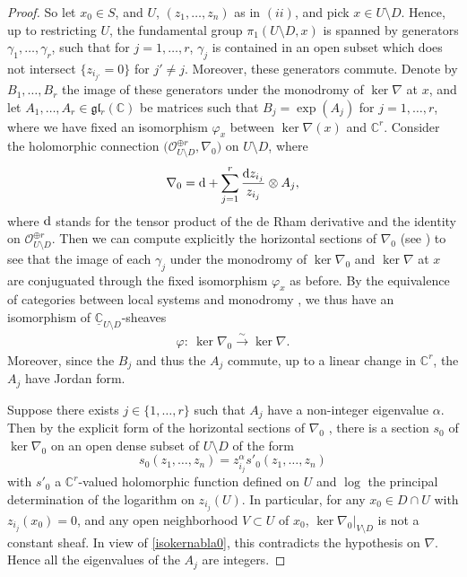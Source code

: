 \documentclass[pdftex]{sigma}
\numberwithin{equation}{section}
\begin{document}
\begin{proof}
So let $x_0\in S$, and $U$, $(z_1,\dots,z_n)$ as in $(ii)$, and pick $x\in U\setminus D$. Hence, up to restricting $U$, the fundamental group $\pi_1(U\setminus D,x)$ is spanned by generators $\gamma_1,\dots,\gamma_r$, such that for $j=1,\dots,r$, $\gamma_j$ is contained in an open subset which does not intersect $\{z_{i_{j'}}=0\}$ for $j'\neq j$. Moreover, these generators commute. Denote by $B_1,\dots,B_r$ the image of these generators under the monodromy of $\ker \nabla$ at $x$, and let $A_1,\dots,A_r\in \mathfrak{g}\mathfrak{l}_r(\mathbb{C})$ be matrices such that $B_j=\exp(A_j)$ for $j=1,\dots,r$, where we have fixed an isomorphism $\varphi_x$ between $\ker \nabla(x)$ and $\mathbb{C}^r$. Consider the holomorphic connection $\big(\mathcal{O}_{U\setminus D}^{\oplus r},\nabla_0\big)$ on $U\setminus D$, where
 \begin{gather*} \nabla_0 = {\rm d}+ \sum_{j=1}^{r} \frac{{\rm d}z_{i_j}}{z_{i_j}} \otimes A_j,
 \end{gather*}
 where ${\rm d}$ stands for the tensor product of the de Rham derivative and the identity on $\mathcal{O}_{U\setminus D}^{\oplus r}$. Then we can compute explicitly the horizontal sections of $\nabla_0$ (see \cite[p.~93]{Deligne}) to see that the image of each $\gamma_j$ under the monodromy of $\ker  \nabla_0$ and $\ker  \nabla$ at $x$ are conjuguated through the fixed isomorphism $\varphi_x$ as before. By the equivalence of categories between local systems and monodromy \cite[Chapter~I, Theorem~2.17]{Deligne}, we thus have an isomorphism of $\underline{\mathbb{C}}_{U\setminus D}$-sheaves
 \begin{gather}\label{isokernabla0} \varphi\colon\ \ker  \nabla_0 \overset{\sim}{\longrightarrow} \ker  \nabla. \end{gather}
 Moreover, since the $B_j$ and thus the $A_j$ commute, up to a linear change in $\mathbb{C}^r$, the $A_j$ have Jordan form.

Suppose there exists $j\in \{1,\dots,r\}$ such that $A_j$ have a non-integer eigenvalue $\alpha$. Then by the explicit form of the horizontal sections of $\nabla_0$ \cite[p.~93]{Deligne}, there is a section $s_0$ of $\ker  \nabla_0$ on an open dense subset of $U\setminus D$ of the form
\[s_0(z_1,\dots,z_n)=z_{i_j}^\alpha s'_0(z_1,\dots,z_n)\]
with $s'_0$ a $\mathbb{C}^r$-valued holomorphic function defined on $U$ and $\log$ the principal determination of the logarithm on $z_{i_j}(U)$. In particular, for any $x_0\in D\cap U$ with $z_{i_j}(x_0)=0$, and any open neighborhood $V\subset U$ of $x_0$, $\ker  \nabla_0|_{V\setminus D}$ is not a constant sheaf. In view of \eqref{isokernabla0}, this contradicts the hypothesis on $\nabla$. Hence all the eigenvalues of the $A_j$ are integers.


\end{proof}
\end{document}
